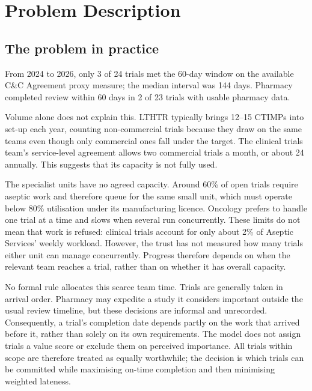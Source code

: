 
\chapter{Problem Description}
\label{ch:problem}

\section{The problem in practice}
\label{sec:inpractice}

From 2024 to 2026, only 3 of 24 trials met the 60-day window on the available C\&C Agreement proxy measure; the median interval was 144 days. Pharmacy completed review within 60 days in 2 of 23 trials with usable pharmacy data.

Volume alone does not explain this. LTHTR typically brings 12--15 CTIMPs into set-up each year, counting non-commercial trials because they draw on the same teams even though only commercial ones fall under the target. The clinical trials team's service-level agreement allows two commercial trials a month, or about 24 annually. This suggests that its capacity is not fully used.

The specialist units have no agreed capacity. Around 60\% of open trials require aseptic work and therefore queue for the same small unit, which must operate below 80\% utilisation under its manufacturing licence. Oncology prefers to handle one trial at a time and slows when several run concurrently. These limits do not mean that work is refused: clinical trials account for only about 2\% of Aseptic Services' weekly workload. However, the trust has not measured how many trials either unit can manage concurrently. Progress therefore depends on when the relevant team reaches a trial, rather than on whether it has overall capacity.

No formal rule allocates this scarce team time. Trials are generally taken in arrival order. Pharmacy may expedite a study it considers important outside the usual review timeline, but these decisions are informal and unrecorded. Consequently, a trial's completion date depends partly on the work that arrived before it, rather than solely on its own requirements. The model does not assign trials a value score or exclude them on perceived importance. All trials within scope are therefore treated as equally worthwhile; the decision is which trials can be committed while maximising on-time completion and then minimising weighted lateness.

